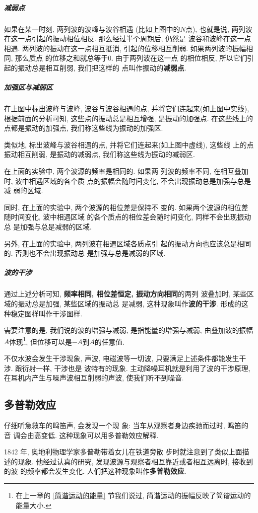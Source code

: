\documentclass[11pt,a4paper]{ctexbook}
\begin{document}
\subparagraph{减弱点} 如果在某一时刻, 两列波的波峰与波谷相遇
(比如上图中的$N$点), 也就是说, 两列波
在这一点引起的振动相位相反. 那么经过半个周期后, 仍然是
波谷和波峰在这一点相遇. 两列波的振动在这一点相互抵消,
引起的位移相互削弱. 如果两列波的振幅相同, 那么质点
的位移之和就总等于0. 由于两列波在这一点
的相位相反, 所以它们引起的振动总是相互削弱, 我们把这样的
点叫作振动的\textbf{减弱点}.

\subparagraph{加强区与减弱区} 在上图中标出波峰与波峰, 波谷与波谷相遇的点,
并将它们连起来(如上图中实线), 根据前面的分析可知, 这些点的振动总是相互增强, 是振动的加强点.
在这些线上的点都是振动的加强点, 我们称这些线为振动的加强区.

类似地, 标出波峰与波谷相遇的点, 并将它们连起来(如上图中虚线), 这些线
上的点振动相互削弱, 是振动的减弱点, 我们称这些线为振动的减弱区.

在上面的实验中, 两个波源的频率是相同的. 如果两
列波的频率不同, 在相互叠加时, 波中相遇区域的各个质
点的振幅会随时间变化, 不会出现振动总是加强与总是减
弱的区域.

同时, 在上面的实验中, 两个波源的相位差是保持不
变的. 如果两个波源的相位差随时间变化, 波中相遇区域
的各个质点的相位差会随时间变化, 同样不会出现振动总
是加强与总是减弱的区域.

另外, 在上面的实验中, 两列波在相遇区域各质点引
起的振动方向也应该总是相同的. 否则也不会出现振动总
是加强与总是减弱的区域.

\subparagraph{波的干涉} 通过上述分析可知,
\textbf{频率相同, 相位差恒定, 振动方向相同}的两列
波叠加时, 某些区域的振动总是加强, 某些区域的振动总
是减弱, 这种现象叫作\textbf{波的干涉}. 形成的这
种稳定图样叫作干涉图样.

需要注意的是, 我们说的波的增强与减弱, 是指能量的增强与减弱,
由叠加波的振幅$A$体现\footnote{在上一章的 \ref{简谐运动的能量} 节我们说过, 简谐运动的振幅反映了简谐运动的能量大小.},
但位移可以是$-A$到$A$的任意值.

不仅水波会发生干涉现象, 声波, 电磁波等一切波,
只要满足上述条件都能发生干涉. 跟衍射一样, 干涉也是
波特有的现象. 主动降噪耳机就是利用了波的干涉原理,
在耳机内产生与噪声波相互削弱的声波, 使我们听不到噪音.

\subsection{多普勒效应}

仔细听急救车的鸣笛声, 会发现一个现
象: 当车从观察者身边疾驰而过时, 鸣笛的音
调会由高变低. 这种现象可以用多普勒效应解释.

1842 年, 奥地利物理学家多普勒带着女儿在铁道旁散
步时就注意到了类似上面描述的现象. 他经过认真的研究,
发现波源与观察者相互靠近或者相互远离时, 接收到的波
的频率都会发生变化. 人们把这种现象叫作\textbf{多普勒效应}.
\end{document}
